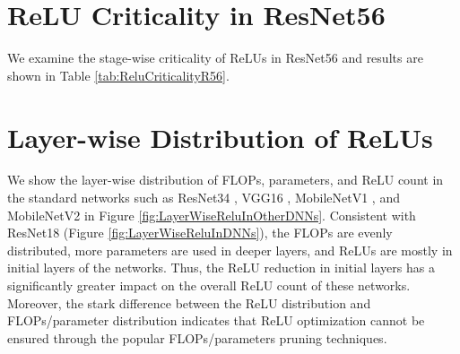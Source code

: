 


\section{ReLU Criticality in ResNet56} \label{SecAppendix:ReluCriticalityInR56}

We examine the stage-wise criticality of ReLUs in ResNet56 and results are shown in Table \ref{tab:ReluCriticalityR56}. 





\section{Layer-wise Distribution of ReLUs} \label{secAppendix:LayerWiseOpsInDNNs}

We show the layer-wise distribution of FLOPs, parameters, and ReLU count in the standard networks such as ResNet34 \cite{he2016deep}, VGG16 \cite{simonyan2014very}, MobileNetV1 \cite{howard2017mobilenets}, and MobileNetV2 \cite{sandler2018mobilenetv2} in Figure \ref{fig:LayerWiseReluInOtherDNNs}. Consistent with ResNet18 (Figure \ref{fig:LayerWiseReluInDNNs}), the FLOPs are evenly distributed, more parameters are used in deeper layers, and ReLUs are mostly in initial layers of the networks. Thus, the ReLU reduction in initial layers has a significantly greater impact on the overall ReLU count of these networks. Moreover, the stark difference between the ReLU distribution and FLOPs/parameter distribution indicates that ReLU optimization cannot be ensured through the popular FLOPs/parameters pruning techniques. 



